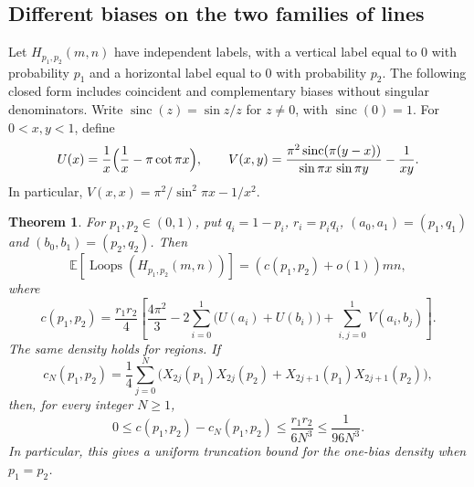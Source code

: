 \documentclass[11pt]{amsart}
\newtheorem{theorem}{Theorem}[section]
\theoremstyle{definition}
\theoremstyle{remark}
\newcommand{\Loops}{\operatorname{Loops}}
\newcommand{\E}{\mathbb{E}}
\begin{document}
\subsection{Different biases on the two families of lines}

Let $H_{p_1,p_2}(m,n)$ have independent labels, with a vertical label equal to $0$ with
probability $p_1$ and a horizontal label equal to $0$ with probability $p_2$. The following
closed form includes coincident and complementary biases without singular denominators.
Write $\operatorname{sinc}(z)=\sin z/z$ for $z\ne0$, with $\operatorname{sinc}(0)=1$.
For $0<x,y<1$, define
\[
U(x)=\frac1x\Bigl(\frac1x-\pi\cot\pi x\Bigr),\qquad
V(x,y)=\frac{\pi^2\operatorname{sinc}(\pi(y-x))}{\sin\pi x\,\sin\pi y}-\frac1{xy}.
\]
In particular, $V(x,x)=\pi^2/\sin^2\pi x-1/x^2$.

\begin{theorem}\label{thm:two-bias}
For $p_1,p_2\in(0,1)$, put $q_i=1-p_i$, $r_i=p_iq_i$, $(a_0,a_1)=(p_1,q_1)$ and
$(b_0,b_1)=(p_2,q_2)$. Then
\[
\E[\Loops(H_{p_1,p_2}(m,n))]=(c(p_1,p_2)+o(1))mn,
\]
where
\begin{equation}\label{eq:two-bias}
c(p_1,p_2)=\frac{r_1r_2}{4}\left[\frac{4\pi^2}{3}
 -2\sum_{i=0}^1\bigl(U(a_i)+U(b_i)\bigr)
 +\sum_{i,j=0}^1V(a_i,b_j)\right].
\end{equation}
The same density holds for regions. If
\[
c_N(p_1,p_2)=\frac14\sum_{j=0}^N\bigl(X_{2j}(p_1)X_{2j}(p_2)
 +X_{2j+1}(p_1)X_{2j+1}(p_2)\bigr),
\]
then, for every integer $N\ge1$,
\begin{equation}\label{eq:tail}
0\le c(p_1,p_2)-c_N(p_1,p_2)\le\frac{r_1r_2}{6N^3}\le\frac1{96N^3}.
\end{equation}
In particular, this gives a uniform truncation bound for the one-bias density when $p_1=p_2$.
\end{theorem}
\end{document}
